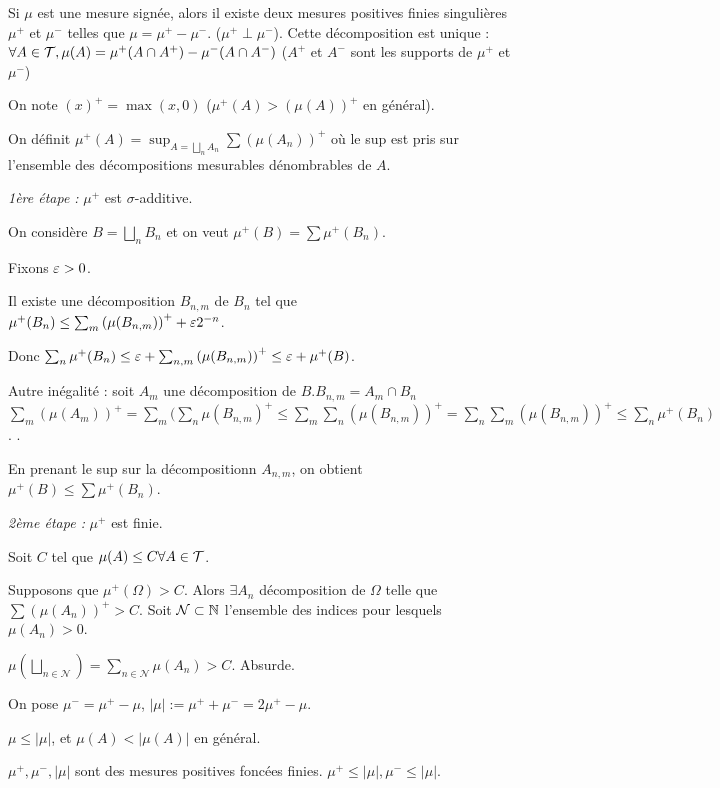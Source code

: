 \documentclass[10pt,a4paper,notitlepage ]{report}
\begin{document}
\begin{theorem}
	Si $\mu$ est une mesure signée, alors il existe deux mesures positives finies singulières $\mu^+$ et $\mu^-$ telles que $\mu=\mu^+ - \mu^-$. ($\mu^+ \perp \mu^-$).
	Cette décomposition est unique : $\forall A \in \mathcal T, \mu(A)=\mu^+(A\cap A^+) - \mu^-(A \cap A^-)$ ($A^+$ et $A^-$ sont les supports de $\mu^+$ et $\mu^-$)
\end{theorem}
\begin{demo}
	On note $(x)^+ = \max(x,0)$ ($\mu^+(A) > (\mu(A))^+$ en général).
	
	On définit $\mu^+(A) = \sup_{A=\bigsqcup_nA_n} \sum(\mu(A_n))^+$ où le sup est pris sur l'ensemble des décompositions mesurables dénombrables de $A$.
	
	\emph{1ère étape : } $\mu^+$ est $\sigma$-additive.
	
	On considère $B=\bigsqcup_n B_n$ et on veut $\mu^+(B)=\sum\mu^+(B_n)$.
	
	Fixons $\varepsilon > 0$.
	
	Il existe une décomposition $B_{n,m}$ de $B_n$ tel que $\mu^+(B_n) \le \sum_m \left(\mu(B_{n,m})\right)^+ + \varepsilon2^{-n}$.
	
	Donc $\sum_n \mu^+(B_n) \le \varepsilon + \sum_{n,m} \left(\mu(B_{n,m})\right)^+ \le \varepsilon + \mu^+(B)$.
	
	Autre inégalité : soit $A_m$ une décomposition de $B$.$B_{n,m} = A_m\cap B_n$
	$\sum_m (\mu(A_m))^+ = \sum_m(\sum_n \mu(B_{n,m})^+ \le \sum_m\sum_n(\mu(B_{n,m}))^+ = \sum_n \sum_m (\mu(B_{n,m}))^+ \le \sum_n \mu^+(B_n)$. .
	
	En prenant le sup sur la décompositionn $A_{n,m}$, on obtient $\mu^+(B) \le \sum\mu^+(B_n)$.
	
	\emph{2ème étape : }$\mu^+$ est finie.
	
	Soit $C$ tel que $\mu(A) \le C \forall A\in\mathcal T$.
	
	Supposons que $\mu^+(\Omega) > C$.
	Alors $\exists A_n$ décomposition de $\Omega$ telle que $\sum(\mu(A_n))^+ > C$. Soit $\mathcal N\subset \mathbb N$ l'ensemble des indices pour lesquels $\mu(A_n) > 0$.
	
	$\mu(\bigsqcup_{n\in\mathcal N}) = \sum_{n\in\mathcal N} \mu(A_n) > C$. Absurde.
		
	On pose $\mu^- = \mu^+ - \mu$, $|\mu| := \mu^+ + \mu^- = 2\mu^+ - \mu$.
	
	$\mu \le |\mu|$, et $\mu(A) < |\mu(A)|$ en général.
	
	$\mu^+, \mu^-, |\mu|$ sont des mesures positives foncées finies. $\mu^+\le |\mu|, \mu^-\le |\mu|$.
	

\end{demo}
\end{document}
